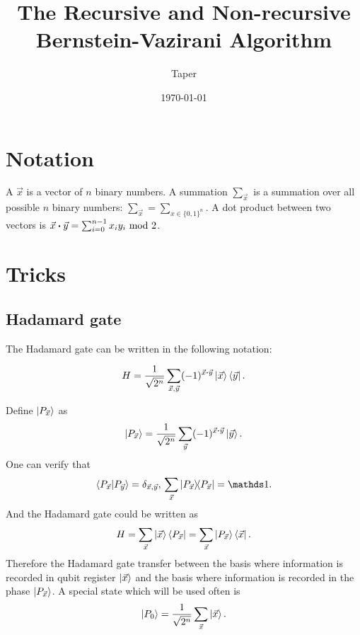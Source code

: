 \documentclass{article}
\title{The Recursive and Non-recursive Bernstein-Vazirani Algorithm}
\date{\today}
\author{Taper}
\begin{document}
\maketitle
{}
\tableofcontents

\section{Notation}
\label{sec:Notation}

A $\vec{x}$ is a vector of $n$ binary numbers. A summation $\sum_{\vec{x}}$ is a
summation over all possible $n$ binary numbers: $\sum_{\vec{x}}=\sum_{x\in
  \{0,1\}^n}$. A dot product between two vectors is $\vec{x}\vdot\vec{y} =
  \sum_{i=0}^{n-1} x_i y_i \text{ mod }2$.

\section{Tricks}
\label{sec:Tricks}

\subsection{Hadamard gate}
\label{sec:Hadamard gate}

The Hadamard gate can be written in the following notation:

\begin{equation}
  H = \frac{1}{\sqrt{2^n}}\sum_{\vec{x},\vec{y}} (-1)^{\vec{x}\vdot\vec{y}}
  \ket{\vec{x}}\bra{\vec{y}}.
\end{equation}

Define $\ket{P_{\vec{x}}}$ as
\begin{equation}
  \ket{P_{\vec{x}}} = \frac{1}{\sqrt{2^n}} \sum_{\vec{y}}
  (-1)^{\vec{x}\vdot\vec{y}} \ket{\vec{y}}.
\end{equation}
One can verify that
\begin{equation}
  \braket{P_{\vec{x}} |P_{\vec{y}}} = \delta_{\vec{x},\vec{y}},\,
  \sum_{\vec{x}}\ketbra{P_{\vec{x}}} = \id.
\end{equation}
And the Hadamard gate could be written as
\begin{equation}
  H = \sum_{\vec{x}} \ket{\vec{x}}\bra{P_{\vec{x}}} 
  = \sum_{\vec{x}} \ket{P_{\vec{x}}} \bra{\vec{x}}.
\end{equation}
Therefore the Hadamard gate transfer between the basis where information is
recorded in qubit register $\ket{\vec{x}}$ and the basis where information is
recorded in the phase $\ket{P_{\vec{x}}}$. A special state which will be used
often is
\begin{equation}
  \ket{P_0} = \frac{1}{\sqrt{2^n}} \sum_{\vec{x}}\ket{\vec{x}}.
\end{equation}
\end{document}
